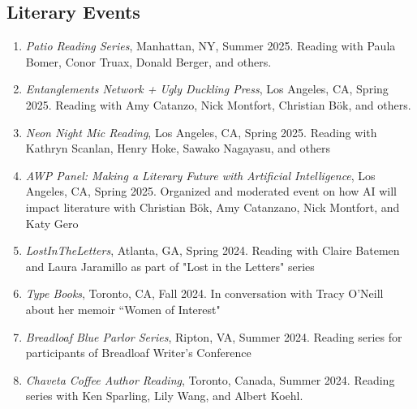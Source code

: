     \subsection{Literary Events}
    \begin{enumerate}
    
      \item \emph{Patio Reading Series}, Manhattan, NY, Summer 2025. \subitem Reading with Paula Bomer, Conor Truax, Donald Berger, and others.\\
    
     \item \emph{Entanglements Network + Ugly Duckling Press}, Los Angeles, CA, Spring 2025. \subitem Reading with Amy Catanzo, Nick Montfort, Christian B\"ok, and others.\\
    
    \item \emph{Neon Night Mic Reading}, Los Angeles, CA, Spring 2025. \subitem Reading with Kathryn Scanlan, Henry Hoke, Sawako Nagayasu, and others\\
    
    	\item \emph{AWP Panel: Making a Literary Future with Artificial Intelligence}, Los Angeles, CA, Spring 2025. \subitem Organized and moderated event on how AI will impact literature with Christian B\"ok, Amy Catanzano, Nick Montfort, and Katy Gero  \\
    
    	\item \emph{LostInTheLetters}, Atlanta, GA, Spring 2024. \subitem Reading with Claire Batemen and Laura Jaramillo as part of "Lost in the Letters" series  \\
    
    	\item \emph{Type Books}, Toronto, CA, Fall 2024. \subitem In conversation with Tracy O'Neill about her memoir ``Women of Interest" \\
    
    	\item \emph{Breadloaf Blue Parlor Series}, Ripton, VA, Summer 2024. \subitem Reading series for participants of Breadloaf Writer's Conference \\
	
    	\item \emph{Chaveta Coffee Author Reading}, Toronto, Canada, Summer 2024. \subitem Reading series with Ken Sparling, Lily Wang, and Albert Koehl. \\
	

\end{enumerate}
